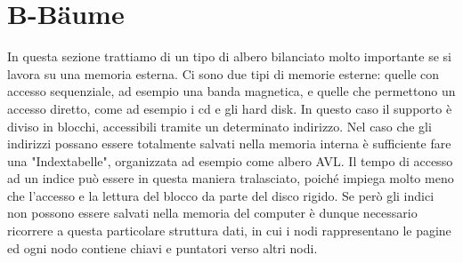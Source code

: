 \documentclass[a4paper]{book}
\begin{document}
\section{B-Bäume}
In questa sezione trattiamo di un tipo di albero bilanciato molto importante se si lavora su una memoria esterna. Ci sono due tipi di memorie esterne: quelle con accesso sequenziale, ad esempio una banda magnetica, e quelle che permettono un accesso diretto, come ad esempio i cd e gli hard disk. In questo caso il supporto è diviso in blocchi, accessibili tramite un determinato indirizzo. Nel caso che gli indirizzi possano essere totalmente salvati nella memoria interna è sufficiente fare una "Indextabelle", organizzata ad esempio come albero AVL. Il tempo di accesso ad un indice può essere in questa maniera tralasciato, poiché impiega molto meno che l'accesso e la lettura del blocco da parte del disco rigido. Se però gli indici non possono essere salvati nella memoria del computer è dunque necessario ricorrere a questa particolare struttura dati, in cui i nodi rappresentano le pagine ed ogni nodo contiene chiavi e puntatori verso altri nodi. 
\end{document}
